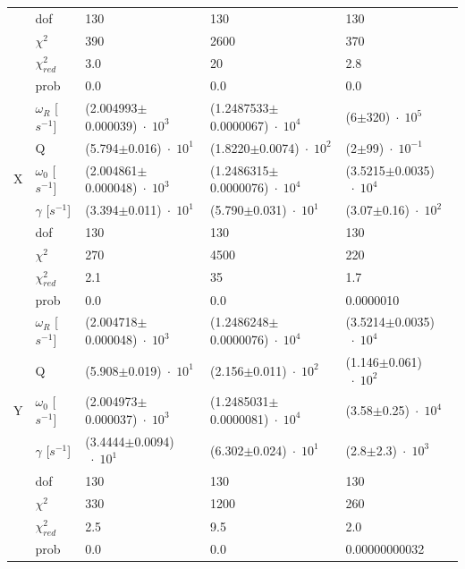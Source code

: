 \begin{center}
\begin{adjustbox}{max width=\linewidth, keepaspectratio}
\begin{tabular}{lllll}
            ~ & dof & 130 & 130 & 130 \\
            ~ & $\chi^2$ & 390 & 2600 & 370 \\
            ~ & $\chi_{red}^2$ & 3.0 & 20 & 2.8 \\
            ~ & prob & 0.0 & 0.0 & 0.0 \\
            ~ & $\omega_R$ [$s^{-1}$] & (2.004993$\pm$0.000039)$\;\cdot\; 10^{3}$ & (1.2487533$\pm$0.0000067)$\;\cdot\; 10^{4}$ & (6$\pm$320)$\;\cdot\; 10^{5}$ \\
            ~ & Q & (5.794$\pm$0.016)$\;\cdot\; 10^{1}$ & (1.8220$\pm$0.0074)$\;\cdot\; 10^{2}$ & (2$\pm$99)$\;\cdot\; 10^{-1}$ \\
            X & $\omega_0$ [$s^{-1}$] & (2.004861$\pm$0.000048)$\;\cdot\; 10^{3}$ & (1.2486315$\pm$0.0000076)$\;\cdot\; 10^{4}$ & (3.5215$\pm$0.0035)$\;\cdot\; 10^{4}$ \\
            ~ & $\gamma$ [$s^{-1}$] & (3.394$\pm$0.011)$\;\cdot\; 10^{1}$ & (5.790$\pm$0.031)$\;\cdot\; 10^{1}$ & (3.07$\pm$0.16)$\;\cdot\; 10^{2}$ \\
            ~ & dof & 130 & 130 & 130 \\
            ~ & $\chi^2$ & 270 & 4500 & 220 \\
            ~ & $\chi_{red}^2$ & 2.1 & 35 & 1.7 \\
            ~ & prob & 0.0 & 0.0 & 0.0000010 \\
            ~ & $\omega_R$ [$s^{-1}$] & (2.004718$\pm$0.000048)$\;\cdot\; 10^{3}$ & (1.2486248$\pm$0.0000076)$\;\cdot\; 10^{4}$ & (3.5214$\pm$0.0035)$\;\cdot\; 10^{4}$ \\
            ~ & Q & (5.908$\pm$0.019)$\;\cdot\; 10^{1}$ & (2.156$\pm$0.011)$\;\cdot\; 10^{2}$ & (1.146$\pm$0.061)$\;\cdot\; 10^{2}$ \\
            Y & $\omega_0$ [$s^{-1}$] & (2.004973$\pm$0.000037)$\;\cdot\; 10^{3}$ & (1.2485031$\pm$0.0000081)$\;\cdot\; 10^{4}$ & (3.58$\pm$0.25)$\;\cdot\; 10^{4}$ \\
            ~ & $\gamma$ [$s^{-1}$] & (3.4444$\pm$0.0094)$\;\cdot\; 10^{1}$ & (6.302$\pm$0.024)$\;\cdot\; 10^{1}$ & (2.8$\pm$2.3)$\;\cdot\; 10^{3}$ \\
            ~ & dof & 130 & 130 & 130 \\
            ~ & $\chi^2$ & 330 & 1200 & 260 \\
            ~ & $\chi_{red}^2$ & 2.5 & 9.5 & 2.0 \\
            ~ & prob & 0.0 & 0.0 & 0.00000000032 \\

\end{tabular}
\end{adjustbox}
\end{center}
